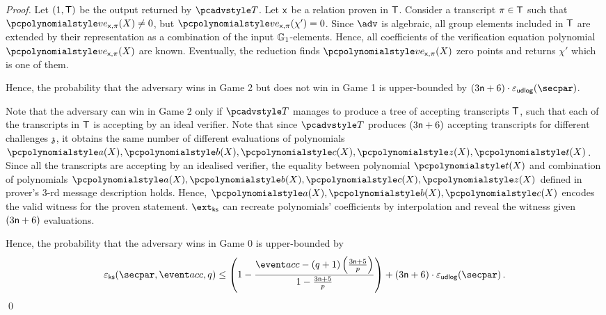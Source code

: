 \begin{proof}
	Let $(1, \mathsf{T})$ be the output returned by $\tdv$. Let $\mathsf{x}$ be a relation proven in $\mathsf{T}$.  Consider a transcript $\pi \in \mathsf{T}$ such that $\vereq_{\inp, \zkproof}(X) \neq 0$, but $\vereq_{\inp, \zkproof}(\chi') = 0$. Since $\adv$ is algebraic, all group elements included in $\mathsf{T}$ are extended by their representation as a combination of the input $\mathbb{G}_1$-elements. Hence, all coefficients of the verification equation polynomial $\vereq_{\inp, \zkproof}(X)$ are known. 
	Eventually, the reduction finds $\vereq_{\inp, \zkproof}(X)$ zero points and returns $\chi'$ which is one of them.
	
	Hence, the probability that the adversary wins in Game 2 but does not win in Game 1 is upper-bounded by $(3 \noofc + 6) \cdot \epsudlog (\secpar)$.
	
	
	Note that the adversary can win in Game 2 only if $\tdv$ manages to produce a tree of accepting transcripts $\mathsf{T}$, such that each of the transcripts in $\mathsf{T}$ is accepting by an ideal verifier. Note that since $\tdv$ produces $(3 \mathsf{n} + 6)$ accepting transcripts for different challenges $\mathfrak{z}$, it obtains the same number of different evaluations of polynomials $\p{a} (X), \p{b} (X), \p{c} (X), \p{z} (X), \p{t} (X)$. Since all the transcripts are accepting by an idealised verifier, the equality between polynomial $\p{t} (X)$ and combination of polynomials $\p{a} (X), \p{b} (X), \p{c} (X), \p{z} (X)$ defined in prover's $3$-rd message description holds. Hence, $\p{a} (X), \p{b} (X), \p{c} (X)$ encodes the valid witness for the proven statement. $\extcss$ can recreate polynomials' coefficients by interpolation and reveal the witness given $(3 \mathsf{n} + 6)$ evaluations. 
	
	
	Hence, the probability that the adversary wins in Game 0 is upper-bounded by 
	\[
	\epscss(\secpar,\accProb, q) \leq \left(1 - \frac{\accProb - (q + 1) \left(\frac{3 \noofc + 5}{p} \right)}{1 - \frac{3 \noofc + 5}{p}}\right) + (3 \noofc + 6) \cdot \epsudlog (\secpar)\,. 
	\]
	\qed
\end{proof}


